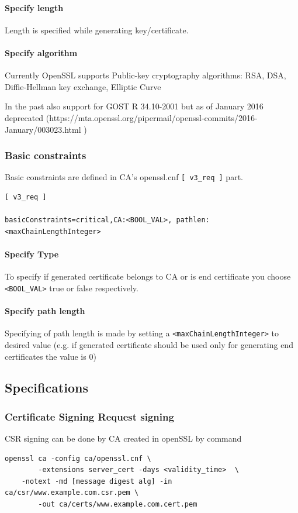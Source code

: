 \documentclass[10pt, a4paper]{report}
\begin{document}
{      \paragraph{Specify length}
      Length is specified while generating key/certificate.
      
      \paragraph{Specify algorithm}
      Currently OpenSSL supports Public-key cryptography algorithms:
      RSA, DSA, Diffie-Hellman key exchange, Elliptic Curve
      
      In the past also support for GOST R 34.10-2001 but as of January 2016 deprecated (https://mta.openssl.org/pipermail/openssl-commits/2016-January/003023.html )
      
      
    \subsubsection{Basic constraints}
    
    Basic constraints are defined in CA's openssl.cnf \verb+[ v3_req ]+ part.
    \begin{verbatim}
[ v3_req ]

basicConstraints=critical,CA:<BOOL_VAL>, pathlen:<maxChainLengthInteger>
    \end{verbatim}

      \paragraph{Specify Type}
To specify if generated certificate belongs to CA or is end certificate you choose \verb+<BOOL_VAL>+ true or false respectively.
      \paragraph{Specify path length}
Specifying of path length is made by setting a \verb+<maxChainLengthInteger>+ to desired value (e.g. if generated certificate should be used only for generating end certificates the value is 0)
  \subsection{Specifications}
  
    \subsubsection{Certificate Signing Request signing}
CSR signing can be done by CA created in openSSL by command
\begin{verbatim}
openssl ca -config ca/openssl.cnf \
        -extensions server_cert -days <validity_time>  \
	-notext -md [message digest alg] -in ca/csr/www.example.com.csr.pem \
        -out ca/certs/www.example.com.cert.pem
\end{verbatim}

}
\end{document}
